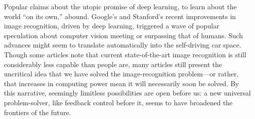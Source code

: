 Popular claims
about the utopic promise of deep learning, to
learn about the world ``on its own,''
abound. Google's and Stanford's recent
improvements in image recognition, driven by deep learning,
\cite{markoffImage} triggered a wave 
of popular speculation about computer vision meeting or surpassing
that of humans. Such
advances might seem to translate automatically into the self-driving
car space. Though some articles note that current
state-of-the-art image recognition is still considerably less capable
than people are, many articles still present the uncritical idea that we have solved
the image-recognition problem---or rather, that increases in computing
power mean it will necessarily soon be solved. By this narrative, seemingly limitless
possibilities are open before us: a new universal problem-solver, like
feedback control before it, seems to have broadened the frontiers
of the future. 



